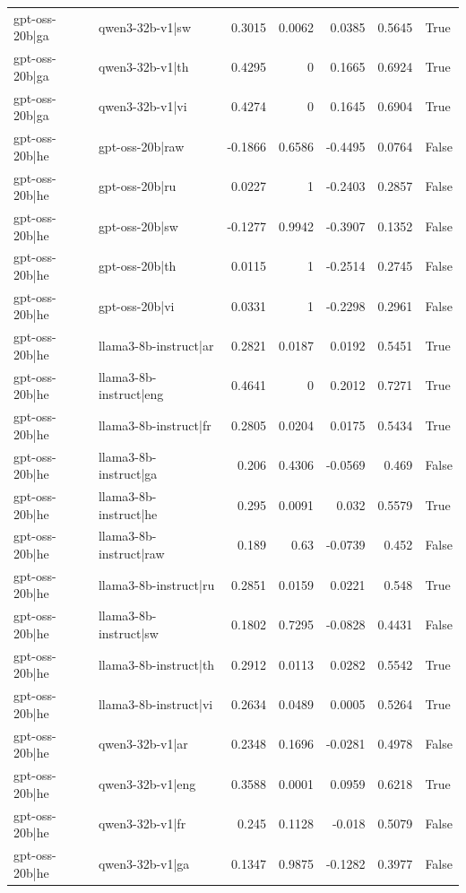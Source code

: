 \begin{table}
\begin{tabular}{l l r r r r l}
gpt-oss-20b|ga & qwen3-32b-v1|sw & 0.3015 & 0.0062 & 0.0385 & 0.5645 & True \\
gpt-oss-20b|ga & qwen3-32b-v1|th & 0.4295 & 0 & 0.1665 & 0.6924 & True \\
gpt-oss-20b|ga & qwen3-32b-v1|vi & 0.4274 & 0 & 0.1645 & 0.6904 & True \\
gpt-oss-20b|he & gpt-oss-20b|raw & -0.1866 & 0.6586 & -0.4495 & 0.0764 & False \\
gpt-oss-20b|he & gpt-oss-20b|ru & 0.0227 & 1 & -0.2403 & 0.2857 & False \\
gpt-oss-20b|he & gpt-oss-20b|sw & -0.1277 & 0.9942 & -0.3907 & 0.1352 & False \\
gpt-oss-20b|he & gpt-oss-20b|th & 0.0115 & 1 & -0.2514 & 0.2745 & False \\
gpt-oss-20b|he & gpt-oss-20b|vi & 0.0331 & 1 & -0.2298 & 0.2961 & False \\
gpt-oss-20b|he & llama3-8b-instruct|ar & 0.2821 & 0.0187 & 0.0192 & 0.5451 & True \\
gpt-oss-20b|he & llama3-8b-instruct|eng & 0.4641 & 0 & 0.2012 & 0.7271 & True \\
gpt-oss-20b|he & llama3-8b-instruct|fr & 0.2805 & 0.0204 & 0.0175 & 0.5434 & True \\
gpt-oss-20b|he & llama3-8b-instruct|ga & 0.206 & 0.4306 & -0.0569 & 0.469 & False \\
gpt-oss-20b|he & llama3-8b-instruct|he & 0.295 & 0.0091 & 0.032 & 0.5579 & True \\
gpt-oss-20b|he & llama3-8b-instruct|raw & 0.189 & 0.63 & -0.0739 & 0.452 & False \\
gpt-oss-20b|he & llama3-8b-instruct|ru & 0.2851 & 0.0159 & 0.0221 & 0.548 & True \\
gpt-oss-20b|he & llama3-8b-instruct|sw & 0.1802 & 0.7295 & -0.0828 & 0.4431 & False \\
gpt-oss-20b|he & llama3-8b-instruct|th & 0.2912 & 0.0113 & 0.0282 & 0.5542 & True \\
gpt-oss-20b|he & llama3-8b-instruct|vi & 0.2634 & 0.0489 & 0.0005 & 0.5264 & True \\
gpt-oss-20b|he & qwen3-32b-v1|ar & 0.2348 & 0.1696 & -0.0281 & 0.4978 & False \\
gpt-oss-20b|he & qwen3-32b-v1|eng & 0.3588 & 0.0001 & 0.0959 & 0.6218 & True \\
gpt-oss-20b|he & qwen3-32b-v1|fr & 0.245 & 0.1128 & -0.018 & 0.5079 & False \\
gpt-oss-20b|he & qwen3-32b-v1|ga & 0.1347 & 0.9875 & -0.1282 & 0.3977 & False \\

\end{tabular}
\end{table}

